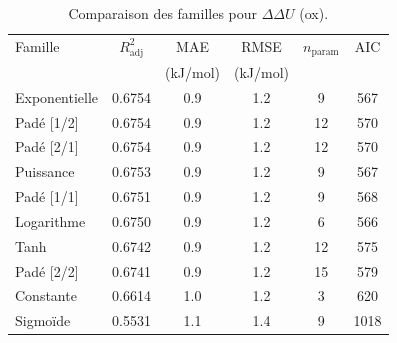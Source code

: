 \begin{table}[htbp]
\centering
\footnotesize
\caption{Comparaison des familles pour $\Delta\Delta U$ (ox).}
\label{tab:s4_ddu_ox_families}
\begin{tabular}{lccccc}
\toprule
Famille & $R^2_{\mathrm{adj}}$ & MAE & RMSE & $n_{\mathrm{param}}$ & AIC \\
 & & (kJ/mol) & (kJ/mol) & & \\
\midrule
Exponentielle & 0.6754 & 0.9 & 1.2 & 9 & 567 \\
Padé [1/2] & 0.6754 & 0.9 & 1.2 & 12 & 570 \\
Padé [2/1] & 0.6754 & 0.9 & 1.2 & 12 & 570 \\
Puissance & 0.6753 & 0.9 & 1.2 & 9 & 567 \\
Padé [1/1] & 0.6751 & 0.9 & 1.2 & 9 & 568 \\
Logarithme & 0.6750 & 0.9 & 1.2 & 6 & 566 \\
Tanh & 0.6742 & 0.9 & 1.2 & 12 & 575 \\
Padé [2/2] & 0.6741 & 0.9 & 1.2 & 15 & 579 \\
Constante & 0.6614 & 1.0 & 1.2 & 3 & 620 \\
Sigmoïde & 0.5531 & 1.1 & 1.4 & 9 & 1018 \\
\bottomrule
\end{tabular}
\end{table}